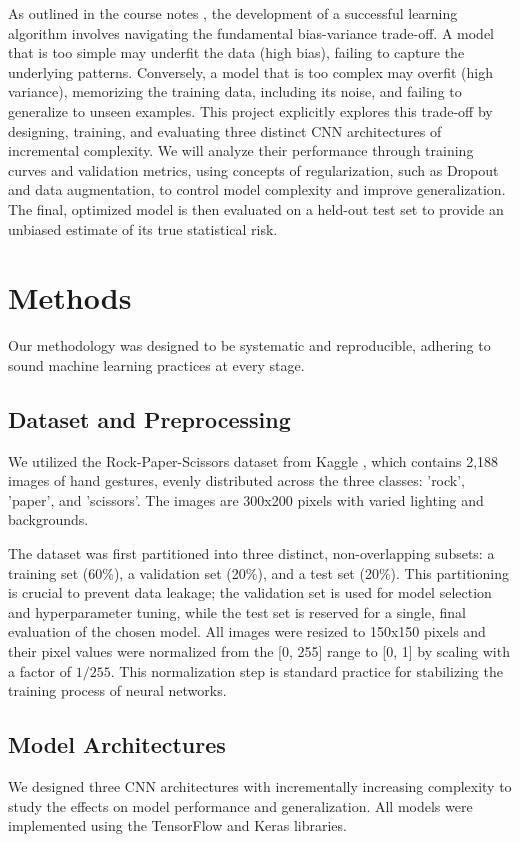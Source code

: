 \documentclass[pdflatex,sn-mathphys-num]{sn-jnl}%
\theoremstyle{thmstyleone}%
\theoremstyle{thmstyletwo}%
\theoremstyle{thmstylethree}%
\begin{document}
As outlined in the course notes \cite{cesa2024smml}, the development of a successful learning algorithm involves navigating the fundamental bias-variance trade-off. A model that is too simple may underfit the data (high bias), failing to capture the underlying patterns. Conversely, a model that is too complex may overfit (high variance), memorizing the training data, including its noise, and failing to generalize to unseen examples. This project explicitly explores this trade-off by designing, training, and evaluating three distinct CNN architectures of incremental complexity. We will analyze their performance through training curves and validation metrics, using concepts of regularization, such as Dropout and data augmentation, to control model complexity and improve generalization. The final, optimized model is then evaluated on a held-out test set to provide an unbiased estimate of its true statistical risk.

\section{Methods}\label{sec11}

Our methodology was designed to be systematic and reproducible, adhering to sound machine learning practices at every stage.

\subsection{Dataset and Preprocessing}
We utilized the Rock-Paper-Scissors dataset from Kaggle \cite{kaggle_rps}, which contains 2,188 images of hand gestures, evenly distributed across the three classes: 'rock', 'paper', and 'scissors'. The images are 300x200 pixels with varied lighting and backgrounds.

The dataset was first partitioned into three distinct, non-overlapping subsets: a training set (60\%), a validation set (20\%), and a test set (20\%). This partitioning is crucial to prevent data leakage; the validation set is used for model selection and hyperparameter tuning, while the test set is reserved for a single, final evaluation of the chosen model. All images were resized to 150x150 pixels and their pixel values were normalized from the [0, 255] range to [0, 1] by scaling with a factor of $1/255$. This normalization step is standard practice for stabilizing the training process of neural networks.

\subsection{Model Architectures}
We designed three CNN architectures with incrementally increasing complexity to study the effects on model performance and generalization. All models were implemented using the TensorFlow and Keras libraries.
\end{document}
